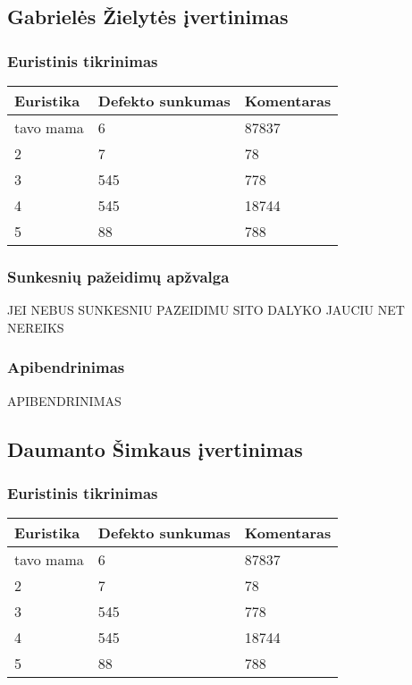 \documentclass{VUMIFPSkursinis}
\begin{document}
\subsection{Gabrielės Žielytės įvertinimas}
\subsubsection{Euristinis tikrinimas}
\begin{center}
 \begin{tabular}{|| p{4cm} | p{4cm} | p{8cm} ||} 
 \hline
 Euristika & Defekto sunkumas & Komentaras \\
 \hline\hline
 tavo mama & 6 & 87837 \\ 
 \hline
 2 & 7 & 78 \\
 \hline
 3 & 545 & 778 \\
 \hline
 4 & 545 & 18744 \\
 \hline
 5 & 88 & 788 \\  %
 \hline                 %
\end{tabular}	
\end{center}

\subsubsection{Sunkesnių pažeidimų apžvalga}
JEI NEBUS SUNKESNIU PAZEIDIMU SITO DALYKO JAUCIU NET NEREIKS

\subsubsection{Apibendrinimas}
APIBENDRINIMAS

\subsection{Daumanto Šimkaus įvertinimas}
\subsubsection{Euristinis tikrinimas}
\begin{center}
 \begin{tabular}{|| p{4cm} | p{4cm} | p{8cm} ||} 
 \hline
 Euristika & Defekto sunkumas & Komentaras \\
 \hline\hline
 tavo mama & 6 & 87837 \\ 
 \hline
 2 & 7 & 78 \\
 \hline
 3 & 545 & 778 \\
 \hline
 4 & 545 & 18744 \\
 \hline
 5 & 88 & 788 \\  %
 \hline                 %
\end{tabular}	
\end{center}
\end{document}
